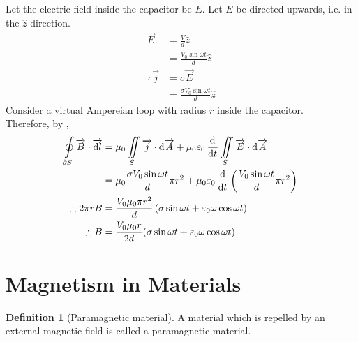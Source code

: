 \documentclass[fleqn, a4paper, 12pt, twoside]{article}
\theoremstyle{definition}
\newtheorem{definition}{Definition}
\theoremstyle{theorem}
\begin{document}
\begin{solution}
	Let the electric field inside the capacitor be $E$.
	Let $E$ be directed upwards, i.e. in the $\hat{z}$ direction.\\
	\begin{align*}
		\overrightarrow{E}            & = \frac{V}{d} \hat{z}                 \\
                                              & = \frac{V_0 \sin \omega t}{d} \hat{z} \\
		\therefore \overrightarrow{j} & = \sigma \overrightarrow{E}           \\
                                              & = \frac{\sigma V_0 \sin \omega t}{d} \hat{z}
	\end{align*}
	Consider a virtual Ampereian loop with radius $r$ inside the capacitor.\\
	Therefore, by ,
	\begin{align*}
		\oint\limits_{\partial S} \overrightarrow{B} \cdot \overrightarrow{\dif l} & = \mu_0 \iint\limits_{S} \overrightarrow{j} \cdot \dif \overrightarrow{A} + \mu_0 \varepsilon_0 \dod{}{t}\iint\limits_{S} \overrightarrow{E} \cdot \dif \overrightarrow{A} \\
                                                                                           & = \mu_0 \frac{\sigma V_0 \sin \omega t}{d} \pi r^2 + \mu_0 \varepsilon_0 \dod{}{t}\left( \frac{V_0 \sin \omega t}{d} \pi r^2 \right)                                       \\
		\therefore 2 \pi r B                                                       & = \frac{V_0 \mu_0 \pi r^2}{d} \left( \sigma \sin \omega t + \varepsilon_0 \omega \cos \omega t \right)                                                                     \\
		\therefore B                                                               & = \frac{V_0 \mu_0 r}{2 d} (\sigma \sin \omega t + \varepsilon_0 \omega \cos \omega t)
	\end{align*}
\end{solution}

\section{Magnetism in Materials}

\begin{definition}[Paramagnetic material]
	A material which is repelled by an external magnetic field is called a paramagnetic material.
\end{definition}
\end{document}
